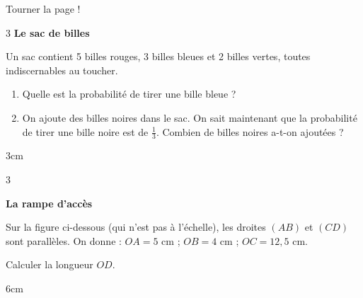 \documentclass[a4paper]{book}
\begin{document}
{    \vfill
    \hfill Tourner la page !


\newpage
    
    
    \begin{exerciceNote}{3}
        \textbf{Le sac de billes}
        
        Un sac contient 5 billes rouges, 3 billes bleues et 2 billes vertes, toutes indiscernables au toucher.
        \begin{enumerate}
            \item Quelle est la probabilité de tirer une bille bleue ?
            \item On ajoute des billes noires dans le sac. On sait maintenant que la probabilité de tirer une bille noire est de $\frac{1}{3}$. Combien de billes noires a-t-on ajoutées ?
        \end{enumerate}
        \begin{ZoneReponse}{3cm}
        \end{ZoneReponse}
    \end{exerciceNote}


    
    \begin{exerciceNote}{3}
        \begin{minipage}{0.4\linewidth}
            \textbf{La rampe d'accès}
            
            Sur la figure ci-dessous (qui n'est pas à l'échelle), les droites $(AB)$ et $(CD)$ sont parallèles.
            On donne : $OA = 5$ cm ; $OB = 4$ cm ; $OC = 12,5$ cm.

            \bigskip

            Calculer la longueur $OD$.
        \end{minipage}
        \hfill
        \begin{minipage}{0.39\linewidth}
            \begin{center}
            \end{center}
        \end{minipage}
        
            
        \begin{ZoneReponse}{6cm}
        \end{ZoneReponse}
    \end{exerciceNote}

}
\end{document}
